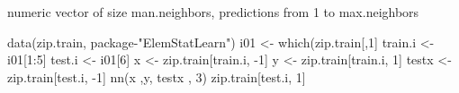 \documentclass[a4paper]{book}
\begin{document}
%
\begin{Value}
numeric vector of size man.neighbors, predictions from 1 to max.neighbors
\end{Value}
%
\begin{Examples}
\begin{ExampleCode}
data(zip.train, package-"ElemStatLearn")
i01 <- which(zip.train[,1] %
train.i <- i01[1:5]
test.i <- i01[6]
x <- zip.train[train.i, -1]
y <- zip.train[train.i, 1]
testx <- zip.train[test.i, -1]
nn(x ,y, testx , 3)
zip.train[test.i, 1]

\end{ExampleCode}
\end{Examples}
\printindex{}
\end{document}
